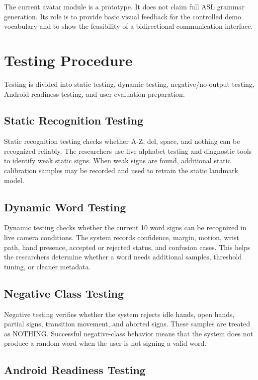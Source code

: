 The current avatar module is a prototype. It does not claim full ASL grammar generation. Its role is to provide basic visual feedback for the controlled demo vocabulary and to show the feasibility of a bidirectional communication interface.

\section{Testing Procedure}

Testing is divided into static testing, dynamic testing, negative/no-output testing, Android readiness testing, and user evaluation preparation.

\subsection{Static Recognition Testing}

Static recognition testing checks whether A-Z, del, space, and nothing can be recognized reliably. The researchers use live alphabet testing and diagnostic tools to identify weak static signs. When weak signs are found, additional static calibration samples may be recorded and used to retrain the static landmark model.

\subsection{Dynamic Word Testing}

Dynamic testing checks whether the current 10 word signs can be recognized in live camera conditions. The system records confidence, margin, motion, wrist path, hand presence, accepted or rejected status, and confusion cases. This helps the researchers determine whether a word needs additional samples, threshold tuning, or cleaner metadata.

\subsection{Negative Class Testing}

Negative testing verifies whether the system rejects idle hands, open hands, partial signs, transition movement, and aborted signs. These samples are treated as NOTHING. Successful negative-class behavior means that the system does not produce a random word when the user is not signing a valid word.

\subsection{Android Readiness Testing}

